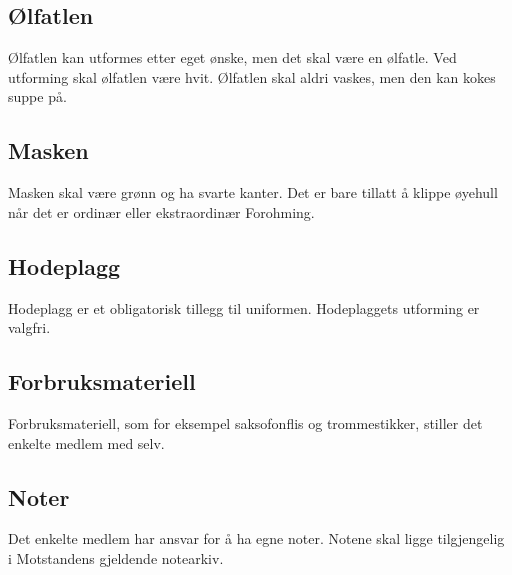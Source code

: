     \subsection{Ølfatlen}
        \begin{statute}
            Ølfatlen kan utformes etter eget ønske, men det skal være en ølfatle. Ved utforming skal ølfatlen være hvit. Ølfatlen skal aldri vaskes, men den kan kokes suppe på.
        \end{statute}
        
    \subsection{Masken}
        \begin{statute}
            Masken skal være grønn og ha svarte kanter. Det er bare tillatt å klippe øyehull når det er ordinær eller ekstraordinær Forohming.
        \end{statute}
        
    \subsection{Hodeplagg}
        \begin{statute}
            Hodeplagg er et obligatorisk tillegg til uniformen. Hodeplaggets utforming er valgfri.
        \end{statute}
        
    \subsection{Forbruksmateriell}
        \begin{statute}
            Forbruksmateriell, som for eksempel saksofonflis og trommestikker, stiller det enkelte medlem med selv.
        \end{statute}
        
    \subsection{Noter}
        \begin{statute}
            Det enkelte medlem har ansvar for å ha egne noter. Notene skal ligge tilgjengelig i Motstandens gjeldende notearkiv.
        \end{statute}
     